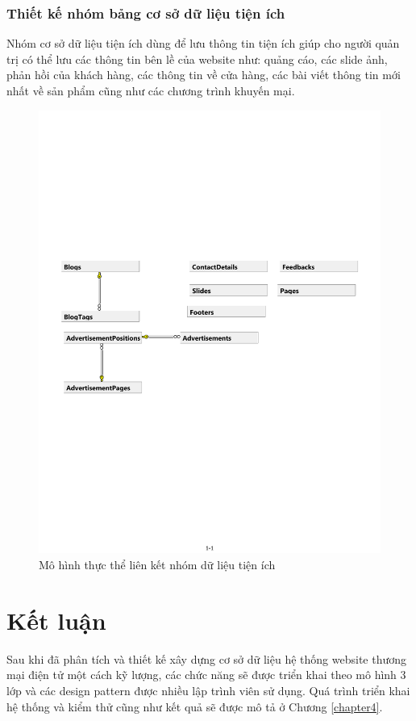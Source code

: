 \subsubsection{Thiết kế nhóm bảng cơ sở dữ liệu tiện ích}
Nhóm cơ sở dữ liệu tiện ích dùng để lưu thông tin tiện ích giúp cho người quản trị có thể lưu các thông tin bên lề của website như: quảng cáo, các slide ảnh, phản hồi của khách hàng, các thông tin về cửa hàng, các bài viết thông tin mới nhất về sản phẩm cũng như các chương trình khuyến mại.
\begin{center}
    \begin{figure}[h]
    \begin{center}
     \includegraphics[scale=0.7]{image/E-RUtil.pdf}
    \end{center}
    \caption{Mô hình thực thể liên kết nhóm dữ liệu tiện ích}
    \label{refhinh3_13}
    \end{figure}
\end{center}

\section{Kết luận}
Sau khi đã phân tích và thiết kế xây dựng cơ sở dữ liệu hệ thống website thương mại điện tử một cách kỹ lượng, các chức năng sẽ được triển khai theo mô hình 3 lớp và các design pattern được nhiều lập trình viên sử dụng. Quá trình triển khai hệ thống và kiểm thử cũng như kết quả sẽ được mô tả ở Chương \ref{chapter4}. 






